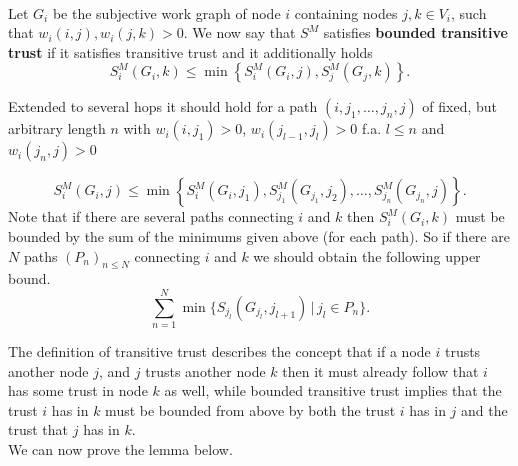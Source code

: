 \begin{definition}\ \\
\label{def:Bounded Transitive Trust}
\noindent{}Let $G_i$ be the subjective work graph of node $i$ containing nodes $j,k\in{}V_i$, such that $w_i(i,j),w_i(j,k)>0$. We now say that $S^M$ satisfies \textbf{bounded transitive trust} if it satisfies transitive trust and it additionally holds 
\[
S^M_i(G_i,k)\leq\min\left\lbrace{}S^M_i(G_i,j), S^M_j(G_j,k)\right\rbrace{}.
\]

\noindent{}Extended to several hops it should hold for a path $(i,j_1,\ldots,j_n,j)$ of fixed, but arbitrary length $n$ with $w_i(i,j_1)>0$, $w_i(j_{l-1},j_l)>0$ f.a. $l\leq{}n$ and $w_i(j_n,j)>0$ 

\[
S^M_i(G_i,j)\leq\min\left\lbrace{}S^M_i(G_i,j_1), S^M_{j_1}(G_{j_1},j_2),\ldots, S^M_{j_n}(G_{j_n},j)\right\rbrace.
\]
\noindent{}Note that if there are several paths connecting $i$ and $k$ then $S^M_i(G_i,k)$ must be bounded by the sum of the minimums given above (for each path). So if there are $N$ paths $(P_n)_{n\leq{}N}$ connecting $i$ and $k$ we should obtain the following upper bound. \vspace{1em}\\

\[
\sum\limits_{n=1}^{N}\min\lbrace{}S_{j_l}(G_{j_l},j_{l+1})\,|\,j_l\in{}P_n\rbrace .
\]
\end{definition}

\noindent{}The definition of transitive trust describes the concept that if a node $i$ trusts another node $j$, and $j$ trusts another node $k$ then it must already follow that $i$ has some trust in node $k$ as well, while bounded transitive trust implies that the trust $i$ has in $k$ must be bounded from above by both the trust $i$ has in $j$ and the trust that $j$ has in $k$. \vspace{1em}\\ 

\noindent{}We can now prove the lemma below.\vspace{1em}\\

